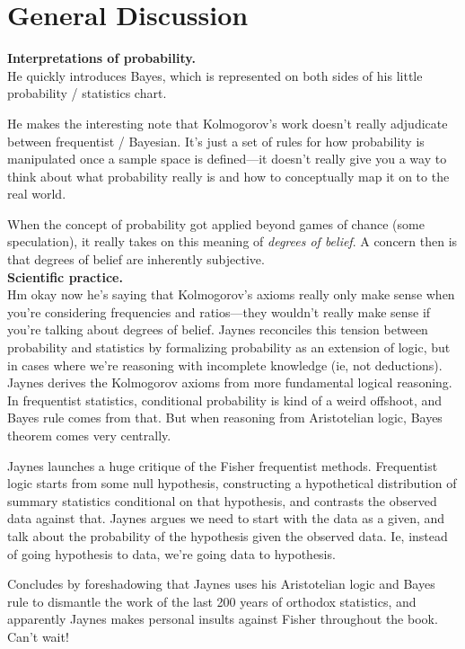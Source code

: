 \documentclass{article}
\begin{document}
\section{General Discussion}

\textbf{Interpretations of probability.}\\

He quickly introduces Bayes, which is represented on both sides of his little
probability / statistics chart.

He makes the interesting note that Kolmogorov's work doesn't really adjudicate between
frequentist / Bayesian. It's just a set of rules for how probability is manipulated once a
sample space is defined---it doesn't really give you a way to think about what probability
really is and how to conceptually map it on to the real world.

When the concept of probability got applied beyond games of chance (some speculation), it
really takes on this meaning of \emph{degrees of belief}. A concern then is that degrees
of belief are inherently subjective. \\

\textbf{Scientific practice.}\\

Hm okay now he's saying that Kolmogorov's axioms really only make sense when you're
considering frequencies and ratios---they wouldn't really make sense if you're talking
about degrees of belief. Jaynes reconciles this tension between probability and statistics
by formalizing probability as an extension of logic, but in cases where we're reasoning
with incomplete knowledge (ie, not deductions). Jaynes derives the Kolmogorov axioms from
more fundamental logical reasoning.  In frequentist statistics, conditional probability is
kind of a weird offshoot, and Bayes rule comes from that. But when reasoning from
Aristotelian logic, Bayes theorem comes very centrally. 

Jaynes launches a huge critique of the Fisher frequentist methods. Frequentist logic
starts from some null hypothesis, constructing a hypothetical distribution of summary
statistics conditional on that hypothesis, and contrasts the observed data against that.
Jaynes argues we need to start with the data as a given, and talk about the probability of
the hypothesis given the observed data. Ie, instead of going hypothesis to data, we're
going data to hypothesis.

Concludes by foreshadowing that Jaynes uses his Aristotelian logic and Bayes rule to
dismantle the work of the last 200 years of orthodox statistics, and apparently Jaynes
makes personal insults against Fisher throughout the book. Can't wait!
\end{document}
